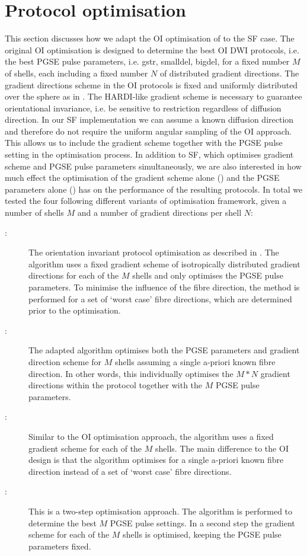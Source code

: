 \section{Protocol optimisation}
\label{sec:chapter 7 four SF optimisations}
This section discusses how we adapt the \gls{OI} optimisation of \citet{Alexander:2008} to the \gls{SF} case. The original \gls{OI} optimisation is designed to determine the best \gls{OI}{} DWI protocols, i.e. the best PGSE pulse parameters, i.e. \gls{gstr}, \gls{smalldel}, \gls{bigdel}, for a fixed number $M$ of shells, each including a fixed number $N$ of distributed gradient directions. The gradient directions scheme in the \gls{OI}{} protocols is fixed and uniformly distributed over the sphere as in \citep{Cook:2007}. The HARDI-like gradient scheme is necessary to guarantee orientational invariance, i.e. be sensitive to restriction regardless of diffusion direction. In our \gls{SF} implementation we can assume a known diffusion direction and therefore do not require the uniform angular sampling of the \gls{OI} approach. This allows us to include the gradient scheme together with the PGSE pulse setting in the optimisation process. In addition to \gls{SF}, which optimises gradient scheme and PGSE pulse parameters simultaneously, we are also interested in how much effect the optimisation of the gradient scheme alone ({\DO}) and the PGSE parameters alone ({\SD}) has on the performance of the resulting protocols. In total we tested the four following different variants of  optimisation framework, given a number of shells $M$ and a number of gradient directions per shell $N$:

\begin{description}
	\item[\OI:] The orientation invariant protocol optimisation as described in \citep{Alexander:2008}. The algorithm uses a fixed gradient scheme of  isotropically distributed gradient directions for each of the $M$ shells and only optimises the PGSE pulse parameters. To minimise the influence of the fibre direction, the method is performed for a set of \lq worst case\rq{} fibre directions, which are determined prior to the optimisation.
	\item[\FD:] The adapted algorithm optimises both the PGSE parameters and gradient direction scheme for $M$ shells assuming a single a-priori known fibre direction. In other words, this individually optimises the $M*N$ gradient directions within the protocol together with the $M$ PGSE pulse parameters.
\item[\SD:] Similar to the {\gls{OI}} optimisation approach, the algorithm uses a fixed gradient scheme for each of the $M$ shells. The main difference to the \gls{OI}{} design is that the algorithm optimises for a single a-priori known fibre direction instead of a set of \lq worst case\rq{} fibre directions.
	\item[\DO:] This is a two-step optimisation approach. The {\SD} algorithm is performed to determine the best $M$ PGSE pulse settings. In a second step the gradient scheme for each of the $M$ shells is optimised, keeping the PGSE pulse parameters fixed.
\end{description}

